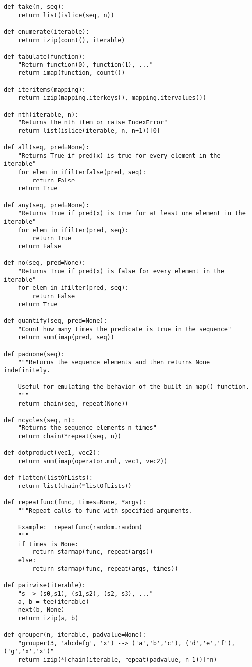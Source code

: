 \begin{verbatim}
def take(n, seq):
    return list(islice(seq, n))

def enumerate(iterable):
    return izip(count(), iterable)

def tabulate(function):
    "Return function(0), function(1), ..."
    return imap(function, count())

def iteritems(mapping):
    return izip(mapping.iterkeys(), mapping.itervalues())

def nth(iterable, n):
    "Returns the nth item or raise IndexError"
    return list(islice(iterable, n, n+1))[0]

def all(seq, pred=None):
    "Returns True if pred(x) is true for every element in the iterable"
    for elem in ifilterfalse(pred, seq):
        return False
    return True

def any(seq, pred=None):
    "Returns True if pred(x) is true for at least one element in the iterable"
    for elem in ifilter(pred, seq):
        return True
    return False

def no(seq, pred=None):
    "Returns True if pred(x) is false for every element in the iterable"
    for elem in ifilter(pred, seq):
        return False
    return True

def quantify(seq, pred=None):
    "Count how many times the predicate is true in the sequence"
    return sum(imap(pred, seq))

def padnone(seq):
    """Returns the sequence elements and then returns None indefinitely.

    Useful for emulating the behavior of the built-in map() function.
    """
    return chain(seq, repeat(None))

def ncycles(seq, n):
    "Returns the sequence elements n times"
    return chain(*repeat(seq, n))

def dotproduct(vec1, vec2):
    return sum(imap(operator.mul, vec1, vec2))

def flatten(listOfLists):
    return list(chain(*listOfLists))

def repeatfunc(func, times=None, *args):
    """Repeat calls to func with specified arguments.
    
    Example:  repeatfunc(random.random)
    """
    if times is None:
        return starmap(func, repeat(args))
    else:
        return starmap(func, repeat(args, times))

def pairwise(iterable):
    "s -> (s0,s1), (s1,s2), (s2, s3), ..."
    a, b = tee(iterable)
    next(b, None)
    return izip(a, b)

def grouper(n, iterable, padvalue=None):
    "grouper(3, 'abcdefg', 'x') --> ('a','b','c'), ('d','e','f'), ('g','x','x')"
    return izip(*[chain(iterable, repeat(padvalue, n-1))]*n)


\end{verbatim}
